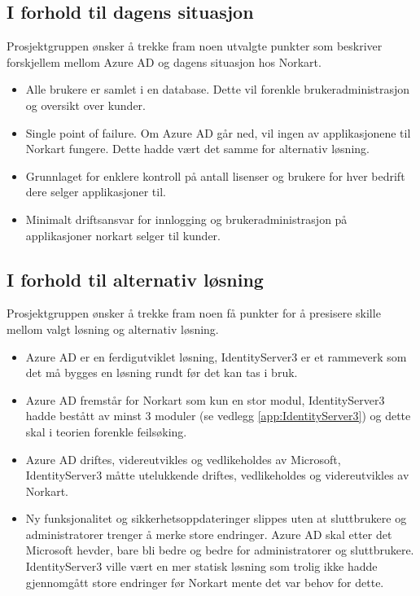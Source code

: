 \subsection{I forhold til dagens situasjon}
\label{sec:valgAvLosning_fordelerOgUlemper_iForholdtilDagensSituajson}
Prosjektgruppen ønsker å trekke fram noen utvalgte punkter som beskriver forskjellem mellom Azure AD og dagens situasjon hos Norkart.
\\
\begin{itemize}
\item Alle brukere er samlet i en database. Dette vil forenkle brukeradministrasjon og oversikt over kunder.
\item Single point of failure. Om Azure AD går ned, vil ingen av applikasjonene til Norkart fungere. Dette hadde vært det samme for alternativ løsning. 
\item Grunnlaget for enklere kontroll på antall lisenser og brukere for hver bedrift dere selger applikasjoner til.
\item Minimalt driftsansvar for innlogging og brukeradministrasjon på applikasjoner norkart selger til kunder. 
\end{itemize}


\subsection{I forhold til alternativ løsning}
\label{sec:valgAvLosning_fordelerOgUlemper_iForholdtilAlternativLosning}
Prosjektgruppen ønsker å trekke fram noen få punkter for å presisere skille mellom valgt løsning og alternativ løsning.
\\
\begin{itemize}
\item Azure AD er en ferdigutviklet løsning, IdentityServer3 er et rammeverk som det må bygges en løsning rundt før det kan tas i bruk.
\item Azure AD fremstår for Norkart som kun en stor modul, IdentityServer3 hadde bestått av minst 3 moduler (se vedlegg \ref{app:IdentityServer3}) og dette skal i teorien forenkle feilsøking.
\item Azure AD driftes, videreutvikles og vedlikeholdes av Microsoft, IdentityServer3 måtte utelukkende driftes, vedlikeholdes og videreutvikles av Norkart.
\item Ny funksjonalitet og sikkerhetsoppdateringer slippes uten at sluttbrukere og administratorer trenger å merke store endringer. Azure AD skal etter det Microsoft hevder, bare bli bedre og bedre for administratorer og sluttbrukere. IdentityServer3 ville vært en mer statisk løsning som trolig ikke hadde gjennomgått store endringer før Norkart mente det var behov for dette.
\end{itemize}


